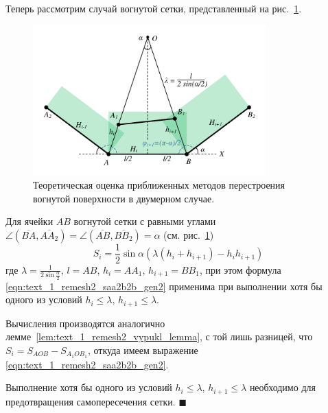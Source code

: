 Теперь рассмотрим случай вогнутой сетки, представленный на рис.~\ref{fig:text_1_remesh_2d_theoretical_concave}.

\begin{figure}[ht]
\centering
\includegraphics[width=0.8\textwidth]{pics/text_1_remesh_2d/theoretical_concave.pdf}
\singlespacing
{}\caption{Теоретическая оценка приближенных методов перестроения вогнутой поверхности в двумерном случае.}
\label{fig:text_1_remesh_2d_theoretical_concave}
\end{figure}

\begin{lemma}
Для ячейки $AB$ вогнутой сетки с равными углами $\angle (\overline{BA}, \overline{AA_2}) = \angle (\overline{AB}, \overline{BB_2}) = \alpha$ (см. рис.~\ref{fig:text_1_remesh_2d_theoretical_concave})
\begin{equation}\label{eqn:text_1_remesh2_saa2b2b_gen2}
S_i = \frac{1}{2} \sin \alpha \left( \lambda(h_i + h_{i+1}) - h_ih_{i+1} \right)
\end{equation}
где $\lambda = \frac{1}{2 \sin \frac{\alpha}{2}}$, $l = AB$, $h_i = AA_1$, $h_{i + 1} = BB_1$, при этом формула \eqref{eqn:text_1_remesh2_saa2b2b_gen2} применима при выполнении хотя бы одного из условий $h_i \le \lambda$, $h_{i+1} \le \lambda$.
\end{lemma}

Вычисления производятся аналогично лемме~\ref{lem:text_1_remesh2_vypukl_lemma}, с той лишь разницей, что $S_i = S_{AOB} - S_{A_1OB_1}$, откуда имеем выражение \eqref{eqn:text_1_remesh2_saa2b2b_gen2}.

Выполнение хотя бы одного из условий $h_i \le \lambda$, $h_{i+1} \le \lambda$ необходимо для предотвращения самопересечения сетки.
$\blacksquare$\\

